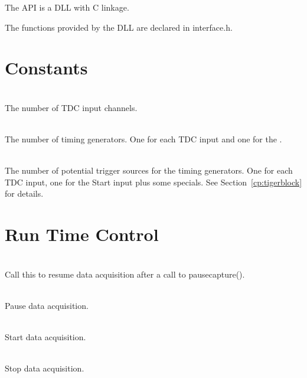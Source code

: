 The API is a DLL with C linkage.\par

The functions provided by the DLL are declared in \textsf{\tu interface.h}.

\section{Constants}

	\\
	The number of TDC input channels.\par

	 \\
	The number of timing generators. One for each TDC input and one for the .\par

	 \\
	The number of potential trigger sources for the timing generators. One for each TDC input, one for the Start input plus some specials. 
	 See Section~\ref{cp:tigerblock} for details.\par


	 

\section{Run Time Control}

	 \\
	 Call this to resume data acquisition after a call to \textsf{\prefix pause\tu capture()}.\par

	 \\
	 Pause data acquisition.\par

	 \\
	 Start data acquisition.\par

	 \\
	 Stop data acquisition.\par



